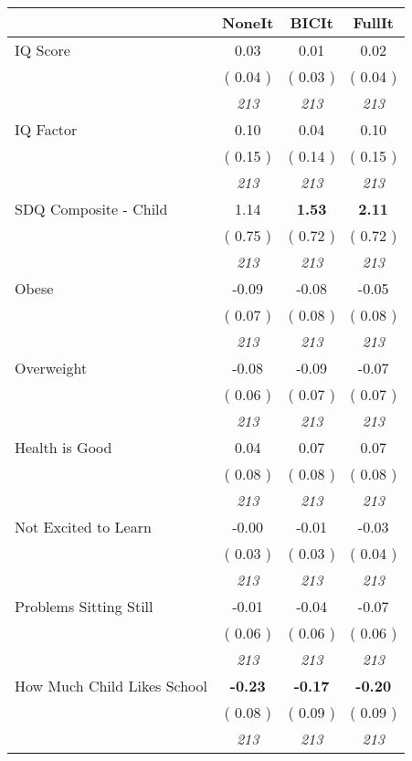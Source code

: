 \begin{tabular}{l c c c}
\toprule
 & NoneIt & BICIt & FullIt \\
\midrule
IQ Score &      0.03 &      0.01 &      0.02 \\
& (     0.04 ) & (     0.03 ) & (     0.04 ) \\
& \textit{ 213 } & \textit{ 213 } & \textit{ 213 } \\
IQ Factor &      0.10 &      0.04 &      0.10 \\
& (     0.15 ) & (     0.14 ) & (     0.15 ) \\
& \textit{ 213 } & \textit{ 213 } & \textit{ 213 } \\
SDQ Composite - Child &      1.14 & \textbf{      1.53 } & \textbf{      2.11 } \\
& (     0.75 ) & (     0.72 ) & (     0.72 ) \\
& \textit{ 213 } & \textit{ 213 } & \textit{ 213 } \\
Obese &     -0.09 &     -0.08 &     -0.05 \\
& (     0.07 ) & (     0.08 ) & (     0.08 ) \\
& \textit{ 213 } & \textit{ 213 } & \textit{ 213 } \\
Overweight &     -0.08 &     -0.09 &     -0.07 \\
& (     0.06 ) & (     0.07 ) & (     0.07 ) \\
& \textit{ 213 } & \textit{ 213 } & \textit{ 213 } \\
Health is Good &      0.04 &      0.07 &      0.07 \\
& (     0.08 ) & (     0.08 ) & (     0.08 ) \\
& \textit{ 213 } & \textit{ 213 } & \textit{ 213 } \\
Not Excited to Learn &     -0.00 &     -0.01 &     -0.03 \\
& (     0.03 ) & (     0.03 ) & (     0.04 ) \\
& \textit{ 213 } & \textit{ 213 } & \textit{ 213 } \\
Problems Sitting Still &     -0.01 &     -0.04 &     -0.07 \\
& (     0.06 ) & (     0.06 ) & (     0.06 ) \\
& \textit{ 213 } & \textit{ 213 } & \textit{ 213 } \\
How Much Child Likes School & \textbf{     -0.23 } & \textbf{     -0.17 } & \textbf{     -0.20 } \\
& (     0.08 ) & (     0.09 ) & (     0.09 ) \\
& \textit{ 213 } & \textit{ 213 } & \textit{ 213 } \\
\bottomrule
\end{tabular}
